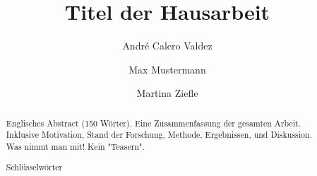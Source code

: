 \documentclass[runningheads,a4paper]{llncs}
\newcommand{\keywords}[1]{\par\addvspace\baselineskip
\noindent\keywordname\enspace\ignorespaces#1}
\begin{document}
\mainmatter  %

\title{Titel der Hausarbeit}



\author{Andr\'{e} Calero Valdez \and Max Mustermann \and Martina Ziefle}
%

%
%


\maketitle


\begin{abstract}

Englisches Abstract (150 Wörter). Eine Zusammenfassung der gesamten Arbeit. 
Inklusive Motivation, Stand der Forschung, Methode, Ergebnissen, und Diskussion.
Was nimmt man mit! Kein "Teasern".


\keywords{5 Schlüsselwörter}
\end{abstract}






\makeatletter
\renewcommand\@biblabel[1]{#1. }
\makeatother

\end{document}
